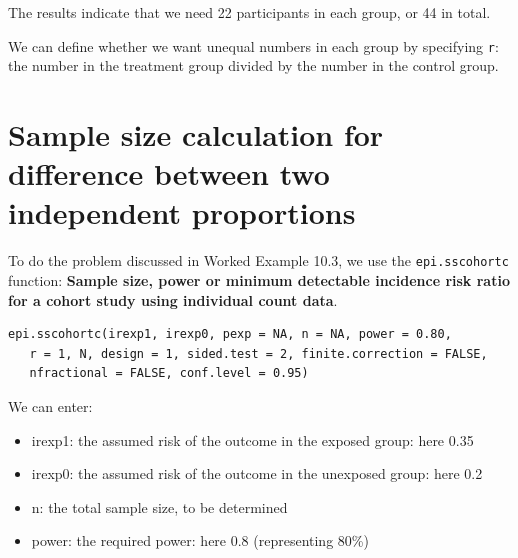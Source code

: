 \documentclass[
]{memoir}
\newenvironment{Shaded}{\begin{snugshade}}{\end{snugshade}}
\newcommand{\AttributeTok}[1]{\textcolor[rgb]{0.77,0.63,0.00}{#1}}
\newcommand{\CommentTok}[1]{\textcolor[rgb]{0.56,0.35,0.01}{\textit{#1}}}
\newcommand{\ConstantTok}[1]{\textcolor[rgb]{0.00,0.00,0.00}{#1}}
\newcommand{\DecValTok}[1]{\textcolor[rgb]{0.00,0.00,0.81}{#1}}
\newcommand{\FloatTok}[1]{\textcolor[rgb]{0.00,0.00,0.81}{#1}}
\newcommand{\FunctionTok}[1]{\textcolor[rgb]{0.00,0.00,0.00}{#1}}
\newcommand{\NormalTok}[1]{#1}
\providecommand{\tightlist}{%
  \setlength{\itemsep}{0pt}\setlength{\parskip}{0pt}}
\begin{document}
\begin{Shaded}
\end{Shaded}

The results indicate that we need 22 participants in each group, or 44 in total.

We can define whether we want unequal numbers in each group by specifying \texttt{r}: the number in the treatment group divided by the number in the control group.

\hypertarget{sample-size-calculation-for-difference-between-two-independent-proportions}{%
\section{Sample size calculation for difference between two independent proportions}\label{sample-size-calculation-for-difference-between-two-independent-proportions}}

To do the problem discussed in Worked Example 10.3, we use the \texttt{epi.sscohortc} function: \textbf{Sample size, power or minimum detectable incidence risk ratio for a cohort study using individual count data}.

\begin{verbatim}
epi.sscohortc(irexp1, irexp0, pexp = NA, n = NA, power = 0.80, 
   r = 1, N, design = 1, sided.test = 2, finite.correction = FALSE, 
   nfractional = FALSE, conf.level = 0.95)
\end{verbatim}

We can enter:

\begin{itemize}
\tightlist
\item
  irexp1: the assumed risk of the outcome in the exposed group: here 0.35
\item
  irexp0: the assumed risk of the outcome in the unexposed group: here 0.2
\item
  n: the total sample size, to be determined
\item
  power: the required power: here 0.8 (representing 80\%)
\end{itemize}
\end{document}
